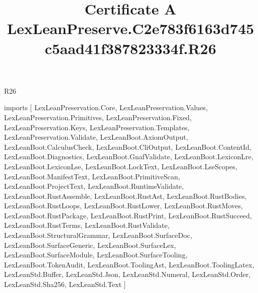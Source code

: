 \begin{lexlean}{R26}
\title{Certificate A LexLeanPreserve.C2e783f6163d745c5aad41f387823334f.R26}
\begin{coremodule}
imports [
  LexLeanPreservation.Core,
  LexLeanPreservation.Values,
  LexLeanPreservation.Primitives,
  LexLeanPreservation.Fixed,
  LexLeanPreservation.Keys,
  LexLeanPreservation.Templates,
  LexLeanPreservation.Validate,
  LexLeanBoot.AxiomOutput,
  LexLeanBoot.CalculusCheck,
  LexLeanBoot.CliOutput,
  LexLeanBoot.ContentId,
  LexLeanBoot.Diagnostics,
  LexLeanBoot.GnafValidate,
  LexLeanBoot.LexiconLre,
  LexLeanBoot.LexiconLse,
  LexLeanBoot.LockText,
  LexLeanBoot.LseScopes,
  LexLeanBoot.ManifestText,
  LexLeanBoot.PrimitiveScan,
  LexLeanBoot.ProjectText,
  LexLeanBoot.RuntimeValidate,
  LexLeanBoot.RustAssemble,
  LexLeanBoot.RustAst,
  LexLeanBoot.RustBodies,
  LexLeanBoot.RustLoops,
  LexLeanBoot.RustLower,
  LexLeanBoot.RustMoves,
  LexLeanBoot.RustPackage,
  LexLeanBoot.RustPrint,
  LexLeanBoot.RustSucceed,
  LexLeanBoot.RustTerms,
  LexLeanBoot.RustValidate,
  LexLeanBoot.StructuralGrammar,
  LexLeanBoot.SurfaceDoc,
  LexLeanBoot.SurfaceGeneric,
  LexLeanBoot.SurfaceLex,
  LexLeanBoot.SurfaceModule,
  LexLeanBoot.SurfaceTooling,
  LexLeanBoot.TokenAudit,
  LexLeanBoot.ToolingAst,
  LexLeanBoot.ToolingLatex,
  LexLeanStd.Buffer,
  LexLeanStd.Json,
  LexLeanStd.Numeral,
  LexLeanStd.Order,
  LexLeanStd.Sha256,
  LexLeanStd.Text
]


\end{coremodule}
\end{lexlean}

